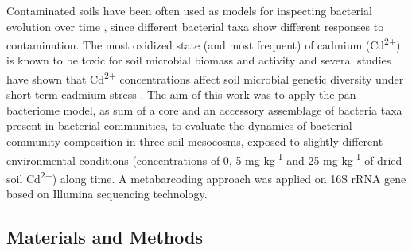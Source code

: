 Contaminated soils have been often used as models for inspecting bacterial evolution over time \cite{mengoni2010plants, porter2013trade}, since different bacterial taxa show different responses to contamination. The most oxidized state (and most frequent) of cadmium (Cd\textsuperscript{2+}) is known to be toxic for soil microbial biomass and activity \cite{renella2002cadmium, renella2005microbial} and several studies have shown that Cd\textsuperscript{2+} concentrations affect soil microbial genetic diversity under short-term cadmium stress \cite{gomes2010effects, lorenz2006response, chien2008microbial, duan2008effect, lazzaro2008identification, sheoran2008remediation, zhang2009responses, fritze2000effect}. The aim of this work was to apply the pan-bacteriome model, as sum of a core and an accessory assemblage of bacteria taxa present in bacterial communities, to evaluate the dynamics of bacterial community composition in three soil mesocosms, exposed to slightly different environmental conditions (concentrations of 0, 5 mg kg\textsuperscript{-1} and 25 mg kg\textsuperscript{-1} of dried soil Cd\textsuperscript{2+}) along time. A metabarcoding approach was applied on 16S rRNA gene based on Illumina sequencing technology.\\

\subsection{Materials and Methods}

